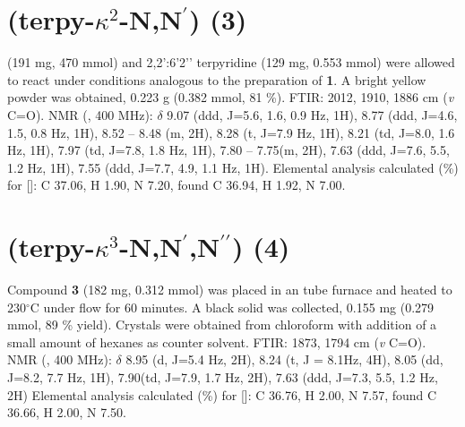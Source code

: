 \section{(terpy-$\kappa^2$-N,N$^\prime$) (3)}\label{sec.c3}
 (191 mg, 470 mmol) and 2,2’:6’2’’ terpyridine (129 mg, 0.553 mmol) were allowed to react under conditions analogous to the preparation of \textbf{1}. A bright yellow powder was obtained, 0.223 g (0.382 mmol, 81 \%). FTIR: 2012, 1910, 1886 cm (\textit{v} C=O).  NMR (, 400 MHz): $\delta$ 9.07 (ddd, J=5.6, 1.6, 0.9 Hz, 1H), 8.77 (ddd, J=4.6, 1.5, 0.8 Hz, 1H), 8.52 – 8.48 (m, 2H), 8.28 (t, J=7.9 Hz, 1H), 8.21 (td, J=8.0, 1.6 Hz, 1H), 7.97 (td, J=7.8, 1.8 Hz, 1H), 7.80 – 7.75(m, 2H), 7.63 (ddd, J=7.6, 5.5, 1.2 Hz, 1H), 7.55 (ddd, J=7.7, 4.9, 1.1 Hz, 1H). Elemental analysis calculated (\%) for []: C 37.06, H 1.90, N 7.20, found C 36.94, H 1.92, N 7.00.  

\section{(terpy-$\kappa^3$-N,N$^\prime$,N$^{\prime \prime}$) (4)}\label{sec.c4}
Compound \textbf{3} (182 mg, 0.312 mmol) was placed in an tube furnace and heated to 230$^\circ$C under  flow for 60 minutes. A black solid was collected, 0.155 mg (0.279 mmol, 89 \% yield). Crystals were obtained from chloroform with addition of a small amount of hexanes as counter solvent. FTIR: 1873, 1794 cm (\textit{v} C=O).  NMR (, 400 MHz): $\delta$ 8.95 (d, J=5.4 Hz, 2H), 8.24 (t, J = 8.1Hz, 4H), 8.05 (dd, J=8.2, 7.7 Hz, 1H), 7.90(td, J=7.9, 1.7 Hz, 2H), 7.63 (ddd, J=7.3, 5.5, 1.2 Hz, 2H) Elemental analysis calculated (\%) for []: C 36.76, H 2.00, N 7.57, found C 36.66, H 2.00, N 7.50.



